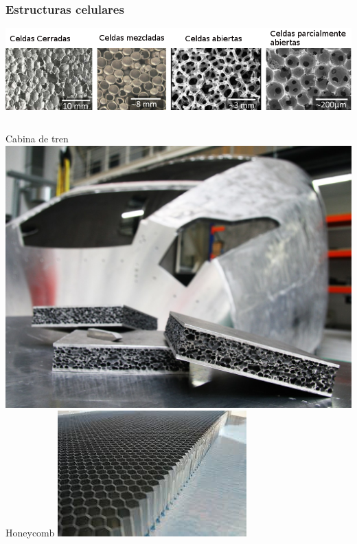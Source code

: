 \documentclass[usenames,dvipsnames]{beamer}
\begin{document}







\begin{frame}
 \frametitle{Estructuras celulares}

 \includegraphics[width=\columnwidth]{img/intro/Fig-1-The-different-kinds-of-cellular-solids-from-closed-cells-to-open-cells.png}
\vfill 
 
 \begin{columns}
 Cabina de tren
\includegraphics[width=0.8\columnwidth]{img/intro/aluminum-foam-ft.jpg}
Honeycomb
\includegraphics[width=0.8\columnwidth]{img/intro/honneycomb.jpeg}
\end{columns}

\end{frame}
\end{document}
